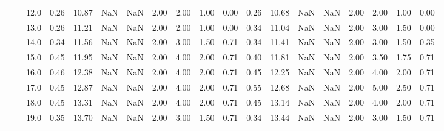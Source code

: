\begin{tabular}{lllrrrrrrrrrrrrrrrr}
       &     & 12.0 &      0.26 &      10.87 &               NaN &                NaN & 2.00 &   2.00 &             1.00 &                         0.00 &      0.26 &      10.68 &               NaN &                NaN & 2.00 &   2.00 &             1.00 &                         0.00 \\
       &     & 13.0 &      0.26 &      11.21 &               NaN &                NaN & 2.00 &   2.00 &             1.00 &                         0.00 &      0.34 &      11.04 &               NaN &                NaN & 2.00 &   3.00 &             1.50 &                         0.00 \\
       &     & 14.0 &      0.34 &      11.56 &               NaN &                NaN & 2.00 &   3.00 &             1.50 &                         0.71 &      0.34 &      11.41 &               NaN &                NaN & 2.00 &   3.00 &             1.50 &                         0.35 \\
       &     & 15.0 &      0.45 &      11.95 &               NaN &                NaN & 2.00 &   4.00 &             2.00 &                         0.71 &      0.40 &      11.81 &               NaN &                NaN & 2.00 &   3.50 &             1.75 &                         0.71 \\
       &     & 16.0 &      0.46 &      12.38 &               NaN &                NaN & 2.00 &   4.00 &             2.00 &                         0.71 &      0.45 &      12.25 &               NaN &                NaN & 2.00 &   4.00 &             2.00 &                         0.71 \\
       &     & 17.0 &      0.45 &      12.87 &               NaN &                NaN & 2.00 &   4.00 &             2.00 &                         0.71 &      0.55 &      12.68 &               NaN &                NaN & 2.00 &   5.00 &             2.50 &                         0.71 \\
       &     & 18.0 &      0.45 &      13.31 &               NaN &                NaN & 2.00 &   4.00 &             2.00 &                         0.71 &      0.45 &      13.14 &               NaN &                NaN & 2.00 &   4.00 &             2.00 &                         0.71 \\
       &     & 19.0 &      0.35 &      13.70 &               NaN &                NaN & 2.00 &   3.00 &             1.50 &                         0.71 &      0.34 &      13.44 &               NaN &                NaN & 2.00 &   3.00 &             1.50 &                         0.71 \\

\end{tabular}
